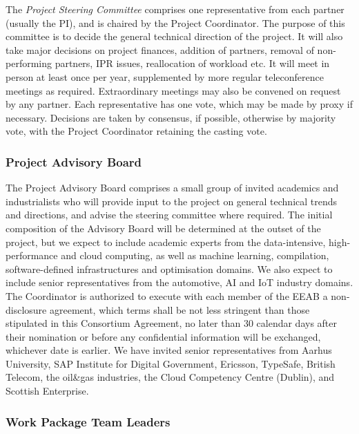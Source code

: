 \documentclass[a4paper,11pt]{article}
\begin{document}
The \emph{Project Steering Committee} comprises one representative from each partner
(usually the PI), and is chaired by the Project Coordinator.  
The purpose of this committee is to decide
the general technical direction of the project.  It will also
take major decisions on project finances, addition of partners, removal of non-performing
partners, IPR issues, reallocation of workload etc.  It will meet in person
at least once per year, supplemented by more regular teleconference
meetings as required. Extraordinary meetings may also be convened on request by any partner.
Each representative has one vote, which
may be made by proxy if necessary.  Decisions are taken by
consensus, if possible, otherwise by majority vote, with the
Project Coordinator retaining the casting vote.

\subsubsection*{Project Advisory Board}
\vspace{-6pt}

The Project Advisory Board comprises a small group of invited
academics and industrialists who will provide input to the
project on general technical trends and directions, and advise
the steering committee where required.  The initial composition
of the Advisory Board will be determined at the outset of the
project, but we expect to include academic experts from the data-intensive, high-performance and cloud computing, as well as machine learning, compilation, software-defined infrastructures and optimisation domains. We also expect to include senior representatives from the automotive, AI and IoT industry domains. The Coordinator is authorized to 
execute with each member of the EEAB a non-disclosure agreement, which 
terms shall be not less stringent than those stipulated in this 
Consortium Agreement, no later than 30 calendar days after their nomination 
or before any confidential information will be exchanged, whichever date is earlier. 
We have invited senior representatives from Aarhus University, SAP Institute for Digital Government, Ericsson, TypeSafe, British Telecom,
the oil\&gas industries, the Cloud Competency Centre (Dublin),
	and Scottish Enterprise.

\pagebreak
\subsubsection*{Work Package Team Leaders}
\vspace{-6pt}
\end{document}
